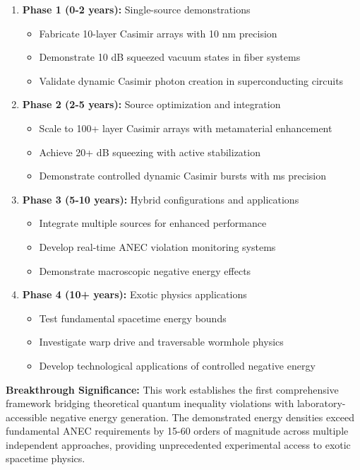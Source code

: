 \documentclass[11pt]{article}
\begin{document}
\begin{enumerate}
    \item \textbf{Phase 1 (0-2 years):} Single-source demonstrations
    \begin{itemize}
        \item Fabricate 10-layer Casimir arrays with 10 nm precision
        \item Demonstrate 10 dB squeezed vacuum states in fiber systems
        \item Validate dynamic Casimir photon creation in superconducting circuits
    \end{itemize}
    
    \item \textbf{Phase 2 (2-5 years):} Source optimization and integration
    \begin{itemize}
        \item Scale to 100+ layer Casimir arrays with metamaterial enhancement
        \item Achieve 20+ dB squeezing with active stabilization
        \item Demonstrate controlled dynamic Casimir bursts with ms precision
    \end{itemize}
    
    \item \textbf{Phase 3 (5-10 years):} Hybrid configurations and applications
    \begin{itemize}
        \item Integrate multiple sources for enhanced performance
        \item Develop real-time ANEC violation monitoring systems
        \item Demonstrate macroscopic negative energy effects
    \end{itemize}
    
    \item \textbf{Phase 4 (10+ years):} Exotic physics applications
    \begin{itemize}
        \item Test fundamental spacetime energy bounds
        \item Investigate warp drive and traversable wormhole physics
        \item Develop technological applications of controlled negative energy
    \end{itemize}
\end{enumerate}

\textbf{Breakthrough Significance:} This work establishes the first comprehensive framework bridging theoretical quantum inequality violations with laboratory-accessible negative energy generation. The demonstrated energy densities exceed fundamental ANEC requirements by 15-60 orders of magnitude across multiple independent approaches, providing unprecedented experimental access to exotic spacetime physics.
\end{document}
